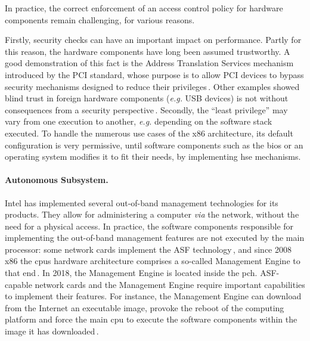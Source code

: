 In practice, the correct enforcement of an access control policy for hardware
components remain challenging, for various reasons.

Firstly, security checks can have an important impact on performance.
%
Partly for this reason, the hardware components have long been assumed
trustworthy.
%
A good demonstration of this fact is the Address Translation Services mechanism
introduced by the PCI standard, whose purpose is to allow PCI devices to bypass
security mechanisms designed to reduce their
privileges\,\cite{daubignard2017protip}.
%
Other examples showed blind trust in foreign hardware components (\emph{e.g.}
USB devices) is not without consequences from a security
perspective\,\cite{nohl2014badusb,hudson2015thunderstrike,chifflier2013uefi}.
%
Secondly, the ``least privilege'' may vary from one execution to another,
\emph{e.g.} depending on the software stack executed.
%
To handle the numerous use cases of the x86 architecture, its default
configuration is very permissive, until software components such as the
\ac{bios} or an operating system modifies it to fit their needs, by implementing
\ac{hse} mechanisms.

%
\paragraph{Autonomous Subsystem.}
%
Intel has implemented several out-of-band management technologies for its
products.
%
They allow for administering a computer \emph{via} the network, without the need
for a physical access.
%
In practice, the software components responsible for implementing the
out-of-band management features are not executed by the main processor: some
network cards implement the ASF technology\,\cite{duflot2010network}, and since
2008 x86 the \acp{cpu} hardware architecture comprises a so-called Management
Engine to that end\,\cite{ruan2014me,skochinsky2014intel}.
%
In 2018, the Management Engine is located inside the \ac{pch}.
%
ASF-capable network cards and the Management Engine require important
capabilities to implement their features.
%
For instance, the Management Engine can download from the Internet an executable
image, provoke the reboot of the computing platform and force the main \ac{cpu}
to execute the software components within the image it has
downloaded\,\cite{kumar2009active}.


